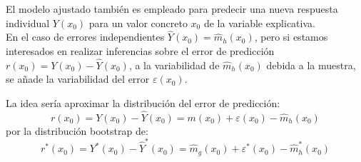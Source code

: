 \documentclass[
]{book}
\theoremstyle{break}
\theoremstyle{nonumberplain}
\begin{document}
El modelo ajustado también es empleado para predecir una nueva respuesta individual \(Y(x_0)\) para un valor concreto \(x_0\) de la variable explicativa.\\
En el caso de errores independientes \(\hat{Y}(x_0) = \hat{m}_h(x_0)\), pero si estamos interesados en realizar inferencias sobre el error de predicción \(r(x_0) = Y(x_0) - \hat{Y}(x_0)\), a la variabilidad de \(\hat{m}_h(x_0)\) debida a la muestra, se añade la variabilidad del error \(\varepsilon(x_0)\).

La idea sería aproximar la distribución del error de predicción:
\[r(x_0) = Y(x_0) - \hat{Y}(x_0) = m(x_0) + \varepsilon(x_0) - \hat{m}_h(x_0)\]
por la distribución bootstrap de:
\[r^{\ast}(x_0) = Y^{\ast}(x_0) - \hat{Y}^{\ast}(x_0) = \hat{m}_g(x_0) + \varepsilon^{\ast}(x_0) - \hat{m}^{\ast}_h(x_0)\]
\end{document}
